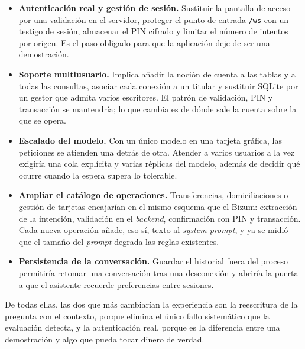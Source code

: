 \begin{itemize}

    \item \textbf{Autenticación real y gestión de sesión.} Sustituir la pantalla
    de acceso por una validación en el servidor, proteger el punto de entrada
    \texttt{/ws} con un testigo de sesión, almacenar el PIN cifrado y limitar el
    número de intentos por origen. Es el paso obligado para que la aplicación
    deje de ser una demostración.

    \item \textbf{Soporte multiusuario.} Implica añadir la noción de cuenta a
    las tablas y a todas las consultas, asociar cada conexión a un titular y
    sustituir SQLite por un gestor que admita varios escritores. El patrón de
    validación, PIN y transacción se mantendría; lo que cambia es de dónde sale
    la cuenta sobre la que se opera.

    \item \textbf{Escalado del modelo.} Con un único modelo en una tarjeta
    gráfica, las peticiones se atienden una detrás de otra. Atender a varios
    usuarios a la vez exigiría una cola explícita y varias réplicas del modelo,
    además de decidir qué ocurre cuando la espera supera lo tolerable.

    \item \textbf{Ampliar el catálogo de operaciones.} Transferencias,
    domiciliaciones o gestión de tarjetas encajarían en el mismo esquema que el
    Bizum: extracción de la intención, validación en el \emph{backend},
    confirmación con PIN y transacción. Cada nueva operación añade, eso sí,
    texto al \textit{system prompt}, y ya se midió que el tamaño del
    \textit{prompt} degrada las reglas existentes.

    \item \textbf{Persistencia de la conversación.} Guardar el historial fuera
    del proceso permitiría retomar una conversación tras una desconexión y
    abriría la puerta a que el asistente recuerde preferencias entre sesiones.

\end{itemize}

De todas ellas, las dos que más cambiarían la experiencia son la reescritura de
la pregunta con el contexto, porque elimina el único fallo sistemático que la
evaluación detecta, y la autenticación real, porque es la diferencia entre una
demostración y algo que pueda tocar dinero de verdad.
